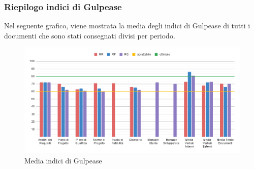 \documentclass[../piano_di_qualifica.tex]{subfiles}
\begin{document}
\subsubsection{Riepilogo indici di Gulpease}
Nel seguente grafico, viene mostrata la media degli indici di Gulpease di tutti i documenti che sono stati consegnati divisi per periodo.

\begin{figure}[H]
	\centering
	\includegraphics[width=14cm]{src/img/gulpease_documenti.png}
	\caption{Media indici di Gulpease}
\end{figure}
\end{document}
